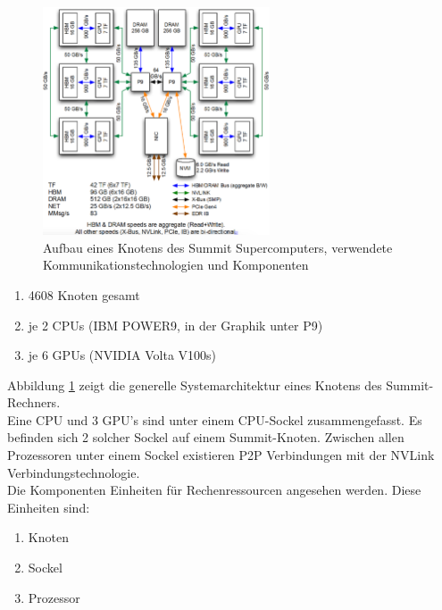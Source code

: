 \begin{figure}
\centering
\includegraphics[width=0.6\textwidth]{res/architecture.png}
\caption{\cite[Abb. 1]{mainpaper} Aufbau eines Knotens des Summit Supercomputers, verwendete Kommunikationstechnologien und Komponenten}
	\label{fig:architecture}
\end{figure}
\begin{enumerate}
	\item 4608 Knoten gesamt
	\item je 2 CPUs (IBM POWER9, in der Graphik unter P9)
	\item je 6 GPUs (NVIDIA Volta V100s)
\end{enumerate} \cite{osummit}
Abbildung \ref{fig:architecture} zeigt die generelle Systemarchitektur eines Knotens des Summit-Rechners.\\
Eine CPU und 3 GPU's sind unter einem CPU-Sockel zusammengefasst. Es befinden sich 2 solcher Sockel auf einem Summit-Knoten. Zwischen allen Prozessoren unter einem Sockel existieren P2P Verbindungen mit der NVLink Verbindungstechnologie.\\
Die Komponenten Einheiten für Rechenressourcen angesehen werden. Diese Einheiten sind:
\begin{enumerate}
	\item Knoten
	\item Sockel
	\item Prozessor
\end{enumerate}

